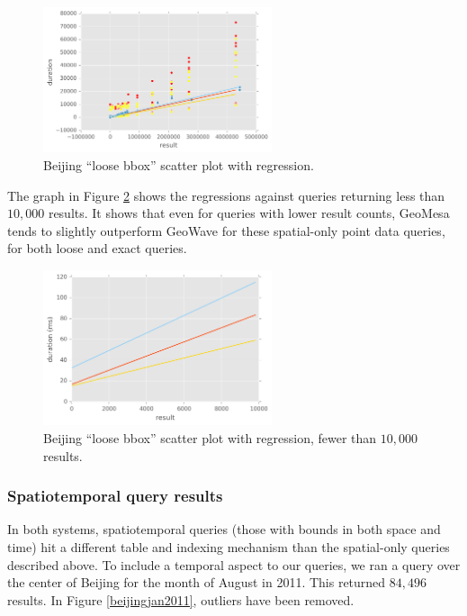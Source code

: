 \begin{figure}[h!tb]
  \centering
  \includegraphics[width=0.60\textwidth]{../docs/img/geolife-bbox-regression-with-loose.png}
  \caption{Beijing ``loose bbox'' scatter plot with regression.}
  \label{beijingloosescatterreg}
\end{figure}

The graph in Figure \ref{beijingloosescatterreg2} shows the regressions against queries returning less than $10,000$ results.
It shows that even for queries with lower result counts, GeoMesa tends to slightly outperform GeoWave
for these spatial-only point data queries, for both loose and exact queries.

\begin{figure}[h!tb]
  \centering
  \includegraphics[width=0.60\textwidth]{../docs/img/geolife-bbox-regression-with-loose-less-than-10000.png}
  \caption{Beijing ``loose bbox'' scatter plot with regression, fewer than $10,000$ results.}
  \label{beijingloosescatterreg2}
\end{figure}

\subsubsection{Spatiotemporal query results}

In both systems, spatiotemporal queries (those with bounds in both space and time) hit a different table and indexing mechanism than the spatial-only queries described above.
To include a temporal aspect to our queries, we ran a query over the center of Beijing for the month of August in 2011.
This returned $84,496$ results.
In Figure \ref{beijingjan2011}, outliers have been removed.

